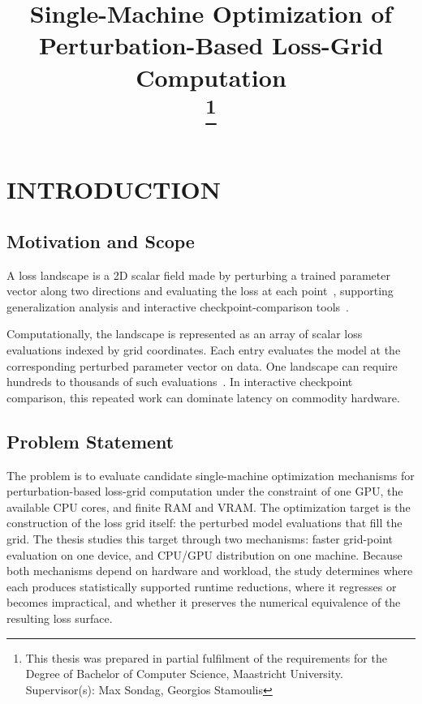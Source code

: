 \documentclass[conference]{IEEEtran}
\begin{document}
\title{Single-Machine Optimization of Perturbation-Based Loss-Grid Computation\\
\thanks{This thesis was prepared in partial fulfilment of the requirements for the Degree of Bachelor of Computer Science, Maastricht University. Supervisor(s): Max Sondag, Georgios Stamoulis}
}

\author{
}

\maketitle



\section{INTRODUCTION}\label{introduction}

\subsection{Motivation and Scope}\label{motivation-and-scope}

A loss landscape is a 2D
scalar field made by perturbing a trained parameter vector
along two directions and evaluating the loss at each
point~\cite{li2018losslandscape}, supporting
generalization analysis and interactive
checkpoint-comparison tools~\cite{xie2025losslens,losslens_repo}.

Computationally, the landscape is represented as an array of
scalar loss evaluations indexed by grid coordinates. Each entry
evaluates the model at the corresponding perturbed parameter
vector on data. One landscape can require hundreds to thousands
of such
evaluations~\cite{li2018losslandscape,goldstein_loss_landscape_repo}.
In interactive checkpoint comparison, this repeated work can
dominate latency on commodity hardware.

\subsection{Problem Statement}\label{problem-statement}

The problem is to evaluate candidate single-machine optimization
mechanisms for perturbation-based loss-grid computation under the
constraint of one GPU, the available CPU cores, and finite RAM
and VRAM. The optimization target is the construction of the
loss grid itself: the perturbed model evaluations that fill the
grid. The thesis studies this target through two mechanisms:
faster grid-point evaluation on one device, and CPU/GPU
distribution on one machine. Because both mechanisms depend on
hardware and workload, the study determines where each produces
statistically supported runtime reductions, where it regresses or
becomes impractical, and whether it preserves the numerical
equivalence of the resulting loss surface.
\end{document}
